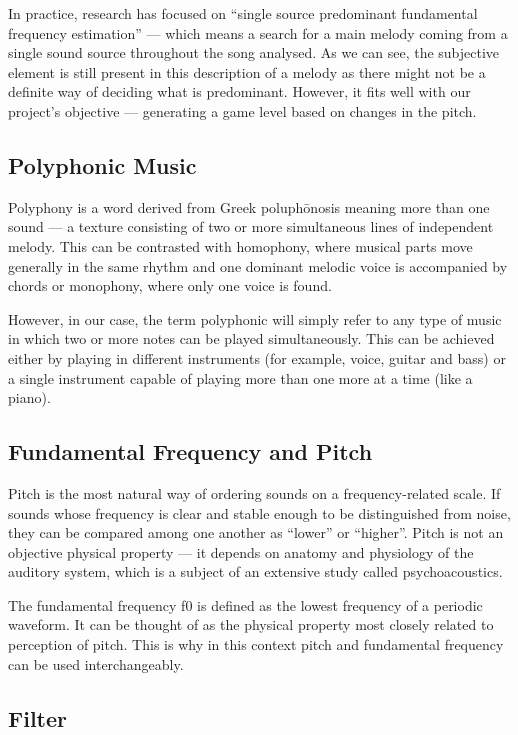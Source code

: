 In practice, research has focused on “single source predominant fundamental frequency estimation” — which means a search for a main melody coming from a single sound source throughout the song analysed. As we can see, the subjective element is still present in this description of a melody as there might not be a definite way of deciding what is predominant. However, it fits well with our project’s objective — generating a game level based on changes in the pitch.


\subsection{Polyphonic Music}

Polyphony is a word derived from Greek poluph\={o}nosis meaning more than one sound — a texture consisting of two or more simultaneous lines of independent melody. This can be contrasted with homophony, where musical parts move generally in the same rhythm and one dominant melodic voice is accompanied by chords or monophony, where only one voice is found. 

However, in our case, the term polyphonic will simply refer to any type of music in which two or more notes can be played simultaneously. This can be achieved either by playing in different instruments (for example, voice, guitar and bass) or a single instrument capable of playing more than one more at a time (like a piano).


\subsection{Fundamental Frequency and Pitch}

Pitch is the most natural way of ordering sounds on a frequency-related scale. If sounds whose frequency is clear and stable enough to be distinguished from noise, they can be compared among  one another as “lower” or “higher”. Pitch is not an objective physical property — it depends on anatomy and physiology of the auditory system, which is a subject of an extensive study called psychoacoustics. 

The fundamental frequency f0 is defined as the lowest frequency of a periodic waveform. It can be thought of as the physical property most closely related to perception of pitch. This is why in this context pitch and fundamental frequency can be used interchangeably.


\subsection{Filter}

